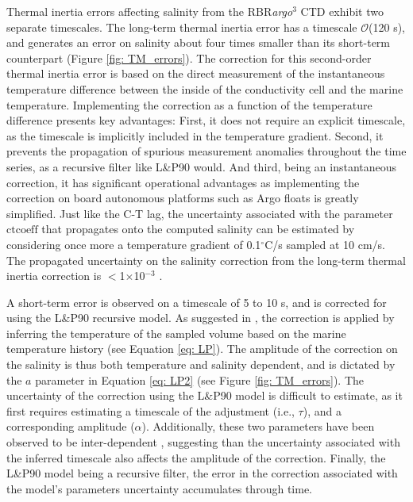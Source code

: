 \documentclass{ametsocV6.1}
\begin{document}
Thermal inertia errors affecting salinity from the RBR\textit{argo}$^3$ CTD exhibit two separate timescales.
The long-term thermal inertia error has a timescale $\mathcal{O}$(120 s), and generates an error on salinity about four times smaller than its short-term counterpart (Figure \ref{fig: TM_errors}).  
The correction for this second-order thermal inertia error is based on the direct measurement of the instantaneous temperature difference between the inside of the conductivity cell and the marine temperature.
Implementing the correction as a function of the temperature difference presents key advantages: First, it does not require an explicit timescale, as the timescale is implicitly included in the temperature gradient.  Second, it prevents the propagation of spurious measurement anomalies throughout the time series, as a recursive filter like L\&P90 would.
And third, being an instantaneous correction, it has significant operational advantages as implementing the correction on board autonomous platforms such as Argo floats is greatly simplified.
Just like the C-T lag, the uncertainty associated with the parameter $\text{ctcoeff}$ that propagates onto the computed salinity can be estimated by considering once more a temperature gradient of 0.1$^\circ$C/s sampled at 10 cm/s. 
The propagated uncertainty on the salinity correction from the long-term thermal inertia correction is $<$1$\times$10$^{-3}$ .

A short-term error is observed on a timescale of 5 to 10 s, and is corrected for using the L\&P90 recursive model. 
As suggested in \cite{Morison_1994}, the correction is applied by inferring the temperature of the sampled volume based on the marine temperature history (see Equation \ref{eq: LP}). 
The amplitude of the correction on the salinity is thus both temperature and salinity dependent, and is dictated by the $a$ parameter in Equation \ref{eq: LP2} (see Figure \ref{fig: TM_errors}).  
The uncertainty of the correction using the L\&P90 model is difficult to estimate, as it first requires estimating a timescale of the adjustment (i.e., $\tau$), and a corresponding amplitude ($\alpha$). 
Additionally, these two parameters have been observed to be inter-dependent \citep{Morison_1994, Lueck_1990b, Martini_2019}, suggesting than the uncertainty associated with the inferred timescale also affects the amplitude of the correction.  
Finally, the L\&P90 model being a recursive filter, the error in the correction associated with the model's parameters uncertainty accumulates through time. 
\end{document}
